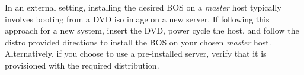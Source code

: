 In an external setting, installing the desired BOS on a {\em master} host 
typically involves booting from a DVD iso image on a new server. If following
this approach for a new system, insert the \baseOS{} DVD, power cycle the host,
and follow the distro provided directions to install the BOS on your chosen
{\em master} host.  Alternatively, if you choose to use a pre-installed server,
verify that it is provisioned with the required \baseOS{} distribution.

